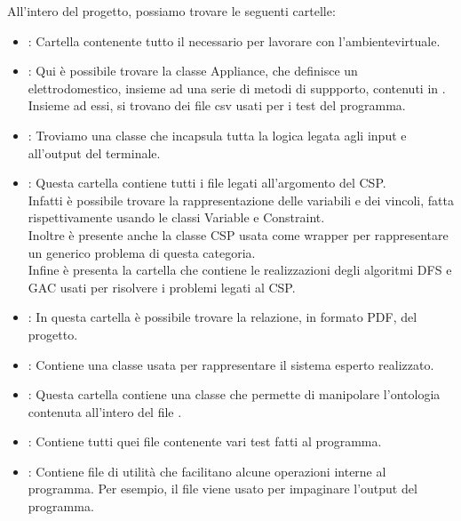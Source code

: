 \documentclass[12pt, letterpaper]{article}
\begin{document}
All'intero del progetto, possiamo trovare le seguenti cartelle:
\begin{itemize}
      \item {}: Cartella contenente tutto il necessario per lavorare con
            l'ambientevirtuale.
      \item {}: Qui è possibile trovare la classe Appliance, che definisce
            un elettrodomestico, insieme ad una serie di metodi di suppporto,
            contenuti in . Insieme ad essi, si trovano dei file csv
            usati per i test del programma.

      \item {}: Troviamo una classe che incapsula tutta la logica legata agli input
            e all'output del terminale.

      \item {}: Questa cartella contiene tutti i file legati all'argomento del
            CSP. \\
            Infatti è possibile trovare la rappresentazione delle variabili e dei vincoli, fatta
            rispettivamente usando le classi Variable e Constraint. \\
            Inoltre è presente anche la classe CSP usata come wrapper per rappresentare un generico
            problema di questa categoria. \\
            Infine è presenta la cartella  che contiene le realizzazioni degli
            algoritmi DFS e GAC usati per risolvere i problemi legati al CSP.

      \item {}: In questa cartella è possibile trovare la relazione, in formato PDF, del
            progetto.

      \item {}: Contiene una classe usata per rappresentare il sistema esperto
            realizzato.

      \item {}: Questa cartella contiene una classe che permette di manipolare
            l'ontologia contenuta all'intero del file .

      \item {}: Contiene tutti quei file contenente vari test fatti al programma.

      \item {}: Contiene file di utilità che facilitano alcune operazioni interne al programma.
            Per esempio, il file  viene usato per impaginare l'output del programma.
\end{itemize}
\end{document}
